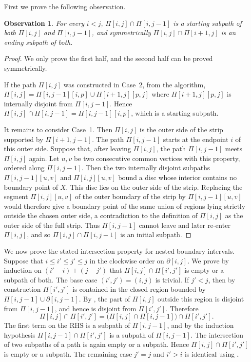 \documentclass[11pt]{article}
\newtheorem{observation}[theorem]{Observation}
\begin{document}
First we prove the following observation.
\begin{observation}
\label{obs: subpath}
For every $i<j$,
$\Pi[i,j]\cap \Pi[i,j-1]$
is a starting subpath of both $\Pi[i,j]$ and $\Pi[i,j-1]$, and symmetrically
$\Pi[i,j]\cap \Pi[i+1,j]$
is an ending subpath of both.    
\end{observation}
\begin{proof}
We only prove the first half, and the second half can be proved symmetrically.

If the path 
$\Pi[i,j]$ was constructed in Case~2, from the algorithm,
$\Pi[i,j]=\Pi[i,j-1][i,p]\cup \Pi[i+1,j][p,j]$
where $\Pi[i+1,j][p,j]$ is internally disjoint from $\Pi[i,j-1]$.
Hence
$\Pi[i,j]\cap \Pi[i,j-1]=\Pi[i,j-1][i,p]$,
which is a starting subpath.

It remains to consider Case~1.  Then $\Pi[i,j]$ is the outer side of
the strip supported by $\Pi[i+1,j-1]$.  The path
$\Pi[i,j-1]$ starts at the endpoint $i$ of this outer side.  Suppose
that, after leaving $\Pi[i,j]$, the path $\Pi[i,j-1]$ meets
$\Pi[i,j]$ again.  Let $u,v$ be two consecutive common vertices with
this property, ordered along $\Pi[i,j-1]$.  Then the two internally
disjoint subpaths
$\Pi[i,j-1][u,v]$ and $\Pi[i,j][u,v]$
bound a disc whose interior contains no boundary point of $X$.  This
disc lies on the outer side of the strip.  Replacing the segment
$\Pi[i,j][u,v]$ of the outer boundary of the strip by
$\Pi[i,j-1][u,v]$ would therefore give a boundary point of the same
union of regions lying strictly outside the chosen outer side, a
contradiction to the definition of $\Pi[i,j]$ as the outer side of the
full strip.  Thus $\Pi[i,j-1]$ cannot leave and later re-enter
$\Pi[i,j]$, and so $\Pi[i,j]\cap \Pi[i,j-1]$ is an initial subpath.
\end{proof}

We now prove the stated intersection property for nested boundary
intervals.  Suppose that
$i\le i'\le j'\le j$
in the clockwise order on $\partial[i,j]$.  We prove by induction on
$(i'-i)+(j-j')$
that $\Pi[i,j]\cap \Pi[i',j']$ is empty or a subpath of both.  The base
case $(i',j')=(i,j)$ is trivial.  If $j'<j$, then by construction
$\Pi[i',j']$ is contained in the closed region bounded by
$\Pi[i,j-1]\cup \partial[i,j-1]$. By , the part of
$\Pi[i,j]$ outside this region is disjoint from $\Pi[i,j-1]$, and
hence is disjoint from $\Pi[i',j']$.  Therefore
\[
    \Pi[i,j]\cap \Pi[i',j']
    =
    \bigl(\Pi[i,j]\cap \Pi[i,j-1]\bigr)\cap \Pi[i',j'] .
\]
The first term on the RHS is a subpath of $\Pi[i,j-1]$,
and by the induction hypothesis
$\Pi[i,j-1]\cap \Pi[i',j']$ is a subpath of $\Pi[i,j-1]$.  The
intersection of two subpaths of a path is again empty or a subpath.
Hence $\Pi[i,j]\cap \Pi[i',j']$ is empty or a subpath.  The remaining
case $j'=j$ and $i'>i$ is identical using .
\end{document}
